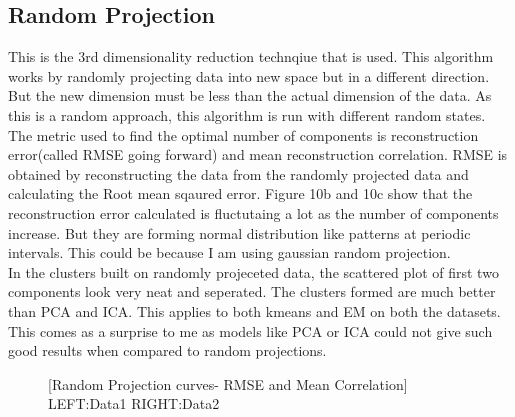 \documentclass[12pt]{article}
\begin{document}
\subsection{Random Projection}
This is the 3rd dimensionality reduction technqiue that is used. This algorithm works by randomly projecting data into new space but in a different direction. But the new dimension must be less than the actual dimension of the data. As this is a random approach, this algorithm is run with different random states.\\

The metric used to find the optimal number of components is reconstruction error(called RMSE going forward) and mean reconstruction correlation. RMSE is obtained by reconstructing the data from the randomly projected data and calculating  the Root mean sqaured error. 
Figure 10b and 10c show that the reconstruction error calculated is fluctutaing a lot as the number of components increase. But they are forming normal distribution like patterns at periodic intervals. This could be because I am using gaussian random projection.\\

In the clusters built on randomly projeceted data, the scattered plot of first two components look very neat and seperated. The clusters formed are much better than PCA and ICA. This applies to both kmeans and EM on both the datasets. This comes as a surprise to me as models like PCA or ICA could not give such good results when compared to random projections.

\begin{figure}[htbp]
    \centering
    \caption{[Random Projection curves- RMSE and Mean Correlation] LEFT:Data1 RIGHT:Data2 }
    \label{fig:foobar}
\end{figure}
\end{document}

